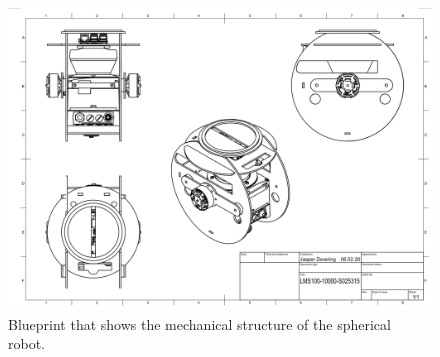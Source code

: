 \begin{figure}                                                                                                                                                                                                    
\centering                                                                                                                                                                                                        
\includegraphics[width=\textwidth]{../Media/BlueprintPNG.png}                                                                                                                                                      
\caption{Blueprint that shows the mechanical structure of the spherical robot.}                                                                                                                                   
\label{sec:TechnicalApproach:fig:blueprint}                                                                                                                                                                       
\end{figure}                                                                                                                                                                                                      
                                                                                                                                                                                                                  
